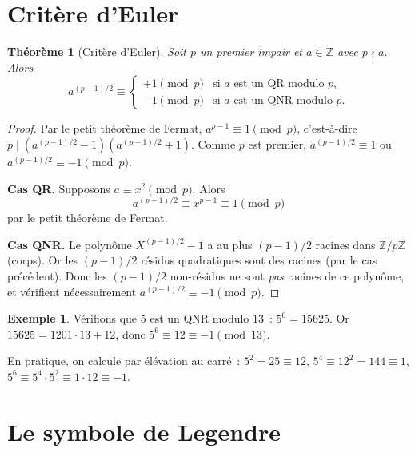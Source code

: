 \documentclass[12pt,a4paper,openany]{book}
\theoremstyle{definition}
\newtheorem{exemple}[definition]{Exemple}
\theoremstyle{plain}
\newtheorem{theoreme}[definition]{Théorème}
\theoremstyle{remark}
\newcommand{\Z}{\mathbb{Z}}
\begin{document}
\section{Critère d'Euler}
\label{sec:qr:euler}

\begin{theoreme}[Critère d'Euler]
\label{thm:euler-criterion}
Soit $p$ un premier impair et $a \in \Z$ avec $p \nmid a$. Alors
\[
  a^{(p-1)/2} \equiv
  \begin{cases}
    +1 \pmod{p} & \text{si } a \text{ est un QR modulo } p, \\
    -1 \pmod{p} & \text{si } a \text{ est un QNR modulo } p.
  \end{cases}
\]
\end{theoreme}

\begin{proof}
Par le petit théorème de Fermat, $a^{p-1} \equiv 1 \pmod{p}$, c'est-à-dire
$p \mid (a^{(p-1)/2} - 1)(a^{(p-1)/2} + 1)$.
Comme $p$ est premier, $a^{(p-1)/2} \equiv 1$ ou $a^{(p-1)/2} \equiv -1 \pmod{p}$.

\medskip
\noindent\textbf{Cas QR.} Supposons $a \equiv x^2 \pmod{p}$. Alors
\[
  a^{(p-1)/2} \equiv x^{p-1} \equiv 1 \pmod{p}
\]
par le petit théorème de Fermat.

\medskip
\noindent\textbf{Cas QNR.} Le polynôme $X^{(p-1)/2} - 1$ a au plus $(p-1)/2$ racines
dans $\Z/p\Z$ (corps). Or les $(p-1)/2$ résidus quadratiques sont des racines
(par le cas précédent). Donc les $(p-1)/2$ non-résidus ne sont \emph{pas} racines
de ce polynôme, et vérifient nécessairement $a^{(p-1)/2} \equiv -1 \pmod{p}$.
\end{proof}

\begin{exemple}
\label{ex:euler-5-mod-13}
Vérifions que $5$ est un QNR modulo $13$~:
$5^{6} = 15625$. Or $15625 = 1201 \cdot 13 + 12$, donc $5^6 \equiv 12 \equiv -1 \pmod{13}$. \checkmark

En pratique, on calcule par élévation au carré~:
$5^2 = 25 \equiv 12$, $5^4 \equiv 12^2 = 144 \equiv 1$, $5^6 \equiv 5^4 \cdot 5^2 \equiv 1 \cdot 12 \equiv -1$. \checkmark
\end{exemple}

\section{Le symbole de Legendre}
\label{sec:qr:legendre}
\end{document}
